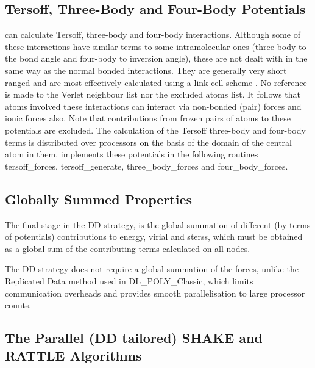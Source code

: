 \subsection{Tersoff, Three-Body and Four-Body Potentials}

\D can calculate Tersoff, three-body and four-body interactions.
Although some of these interactions have similar terms to some
intramolecular ones (three-body to the bond angle and four-body to
inversion angle), these are not dealt with in the same way as the
normal bonded interactions.  They are
generally very short ranged and are most effectively calculated
using a link-cell scheme \cite{hockney-81a}.  No reference is made
to the Verlet neighbour list nor the
excluded atoms list.  It follows that atoms involved these
interactions can interact via non-bonded (pair) forces and ionic
forces also.  Note that contributions from frozen pairs of atoms
to these potentials are excluded.  The calculation of the Tersoff
three-body and four-body terms is distributed over
processors on the basis of the domain of the central atom in them.
\D implements these potentials in the following routines
{\sc tersoff\_forces}, {\sc tersoff\_generate},
{\sc three\_body\_forces} and {\sc four\_body\_forces}.

\subsection{Globally Summed Properties}

The final stage in the DD strategy, is the global summation of
different (by terms of potentials) contributions to energy, virial
and sterss, which must be obtained as a global sum of the
contributing terms calculated on all nodes.

The DD strategy does not require a global summation of the forces,
unlike the Replicated Data method used in DL\_POLY\_Classic, which
limits communication overheads and provides smooth parallelisation
to large processor counts.

\subsection{The Parallel (DD tailored) SHAKE and RATTLE Algorithms}

